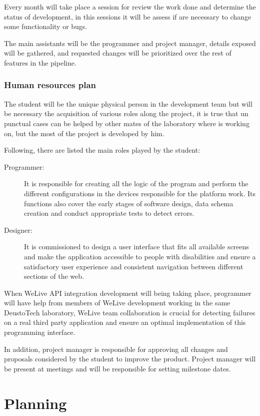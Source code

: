 \documentclass{DeustoFDP}
\begin{document}
Every month will take place a session for review the work done and determine the status of development, in this sessions it will be assess if are necessary to change some functionality or bugs.

The main assistants will be the programmer and project manager, details exposed will be gathered, and requested changes will be prioritized over the rest of features in the pipeline.

\subsection{Human resources plan}
The student will be the unique physical person in the development team but will be necessary the acquisition of various roles along the project, it is true that un punctual cases can be helped by other mates of the laboratory where is working on, but the most of the project is developed by him.

Following, there are listed the main roles played by the student:

\begin{description}
	\item[Programmer:] It is responsible for creating all the logic of the program and perform the different configurations in the devices responsible for the platform work. Its functions also cover the early stages of software design, data schema creation and conduct appropriate tests to detect errors.
	
	\item[Designer:] It is commissioned to design a user interface that fits all available screens and make the application accessible to people with disabilities and ensure a satisfactory user experience and consistent navigation between different sections of the web.
\end{description}

When WeLive API integration development will being taking place, programmer will have help from members of WeLive development working in the same DeustoTech laboratory, WeLive team collaboration is crucial for detecting failures on a real third party application and ensure an optimal implementation of this programming interface.

In addition, project manager is responsible for approving all changes and proposals considered by the student to improve the product. Project manager will be present at meetings and will be responsible for setting milestone dates.

\chapter{Planning}\label{cha:planning}
\end{document}
